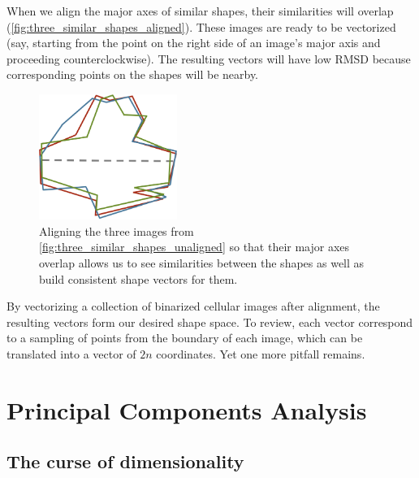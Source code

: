 When we align the major axes of similar shapes, their similarities will overlap (\autoref{fig:three_similar_shapes_aligned}). These images are ready to be vectorized (say, starting from the point on the right side of an image's major axis and proceeding counterclockwise). The resulting vectors will have low RMSD because corresponding points on the shapes will be nearby.

\begin{figure}[h]
\centering
\mySfFamily
\includegraphics[width = 0.4\textwidth]{../images/three_similar_shapes_aligned.png}
\caption{Aligning the three images from \autoref{fig:three_similar_shapes_unaligned} so that their major axes overlap allows us to see similarities between the shapes as well as build consistent shape vectors for them.}
\label{fig:three_similar_shapes_aligned}
\end{figure}

\begin{note}\end{note}

By vectorizing a collection of binarized cellular images after alignment, the resulting vectors form our desired shape space. To review, each vector correspond to a sampling of  points from the boundary of each image, which can be translated into a vector of $2n$ coordinates. Yet one more pitfall remains.


\FloatBarrier
{}

\section{Principal Components Analysis}
\label{sec:pca}

\subsection{The curse of dimensionality}

